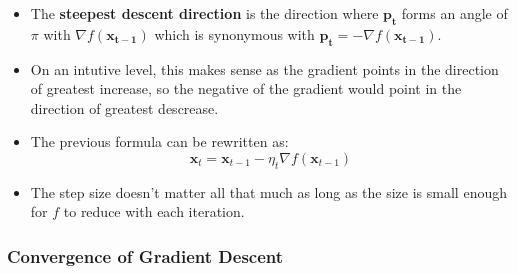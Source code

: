 \documentclass{article}
\newcommand{\tbf}[1]{\textbf{#1}}
\newcommand{\mbf}[1]{\mathbf{#1}}
\begin{document}
\begin{itemize}
    \item The \tbf{steepest descent direction} is the direction where $\mbf{p_t}$ forms an angle of $\pi$ with $\nabla f(\mbf{x_{t-1}})$ which is synonymous with $\mbf{p_t} = -\nabla f(\mbf{x_{t-1}})$.
    \item On an intutive level, this makes sense as the gradient points in the direction of greatest increase, so the negative of the gradient would point in the direction of greatest descrease. 
    \item The previous formula can be rewritten as:
    \[\mbf{x}_t = \mbf{x}_{t-1} - \eta _t \nabla f(\mbf{x}_{t-1})\]
    \item The step size doesn't matter all that much as long as the size is small enough for $f$ to reduce with each iteration. 
    
    \end{itemize}
    \subsubsection{Convergence of Gradient Descent}
\end{document}
